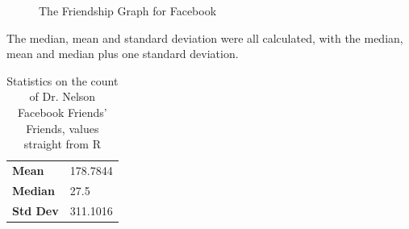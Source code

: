 
\vspace{5mm}
\begin{figure}[h!]
\centering
{}
\caption{The Friendship Graph for Facebook}
\label{fig:facebook_graphml}
\end{figure}
\newpage
The median, mean and standard deviation were all calculated, with the median, mean and median plus one standard deviation.
\vspace*{2mm}
\begin{table}
\centering
\begin{tabular}{ l l }
\hline
\textbf{Mean} & 178.7844 \\
\textbf{Median} & 27.5 \\
\textbf{Std Dev} & 311.1016\\
\hline
\end{tabular}
\caption{Statistics on the count of Dr. Nelson Facebook Friends' Friends, values straight from R}
\label{tab:q1stats}
\end{table}

